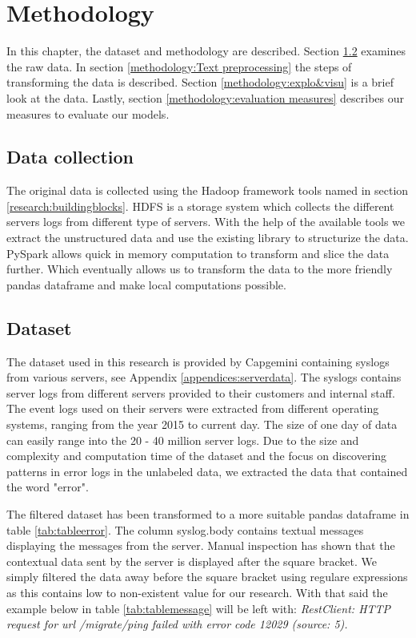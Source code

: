 \chapter{Methodology}  \label{ch:methodology}

In this chapter, the dataset and methodology are described. Section \ref{methodology:dataset} examines the raw data. In section \ref{methodology:Text preprocessing} the steps of transforming the data is described. Section \ref{methodology:explo&visu} is a brief look at the data. Lastly, section \ref{methodology:evaluation measures} describes our measures to evaluate our models.

\section{Data collection}
The original data is collected using the Hadoop framework tools named in section \ref{research:buildingblocks}. HDFS is a storage system which collects the different servers logs from different type of servers. With the help of the available tools we extract the unstructured data and use the existing library to structurize the data. PySpark allows quick in memory computation to transform and slice the data further. Which eventually allows us to transform the data to the more friendly pandas dataframe and make local computations possible.  
 
\section{Dataset}\label{methodology:dataset}
The dataset used in this research is provided by Capgemini containing syslogs from various servers, see Appendix \ref{appendices:serverdata}. The syslogs contains server logs from different servers provided to their customers and internal staff. The event logs used on their servers were extracted from different operating systems, ranging from the year 2015 to current day. The size of one day of data can easily range into the 20 - 40 million server logs. Due to the size and complexity and computation time of the dataset and the focus on discovering patterns in error logs in the unlabeled data, we extracted the data that contained the word "error". 

The filtered dataset has been transformed to a more suitable pandas dataframe in table \ref{tab:tableerror}. The column syslog.body contains textual messages displaying the messages from the server. Manual inspection has shown that the contextual data sent by the server is displayed after the square bracket. We simply filtered the data away before the square bracket using regulare expressions as this contains low to non-existent value for our research. 
With that said the example below in table \ref{tab:tablemessage} will be left with: \textit{RestClient: HTTP request for url /migrate/ping failed with error code 12029 (source: 5).} 

